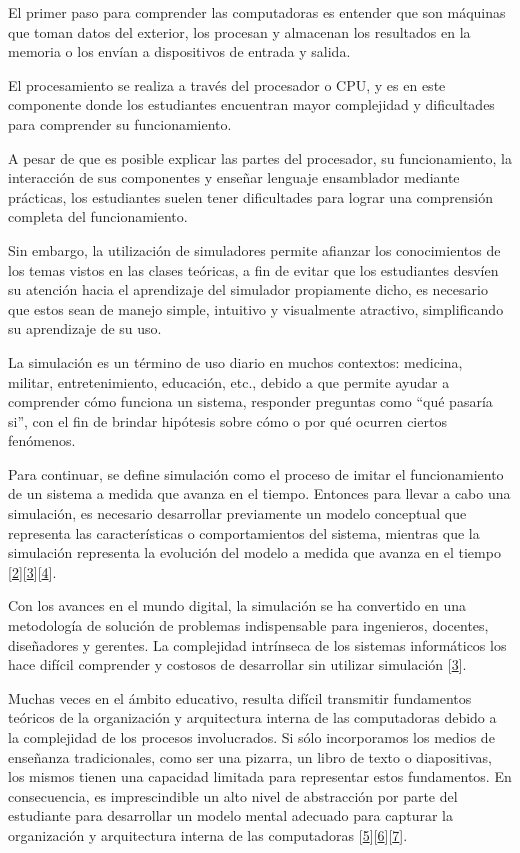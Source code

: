 \documentclass[12pt,twoside]{templates/unerthesis}
\begin{document}
El primer paso para comprender las computadoras es entender que son máquinas que toman datos del exterior, los procesan y almacenan los resultados en la memoria o los envían a dispositivos de entrada y salida.

El procesamiento se realiza a través del procesador o CPU, y es en este componente donde los estudiantes encuentran mayor complejidad y dificultades para comprender su funcionamiento.

A pesar de que es posible explicar las partes del procesador, su funcionamiento, la interacción de sus componentes y enseñar lenguaje ensamblador mediante prácticas, los estudiantes suelen tener dificultades para lograr una comprensión completa del funcionamiento.

Sin embargo, la utilización de simuladores permite afianzar los conocimientos de los temas vistos en las clases teóricas, a fin de evitar que los estudiantes desvíen su atención hacia el aprendizaje del simulador propiamente dicho, es necesario que estos sean de manejo simple, intuitivo y visualmente atractivo, simplificando su aprendizaje de su uso.

La simulación es un término de uso diario en muchos contextos: medicina, militar, entretenimiento, educación, etc., debido a que permite ayudar a comprender cómo funciona un sistema, responder preguntas como ``qué pasaría si'', con el fin de brindar hipótesis sobre cómo o por qué ocurren ciertos fenómenos.

Para continuar, se define simulación como el proceso de imitar el funcionamiento de un sistema a medida que avanza en el tiempo. Entonces para llevar a cabo una simulación, es necesario desarrollar previamente un modelo conceptual que representa las características o comportamientos del sistema, mientras que la simulación representa la evolución del modelo a medida que avanza en el tiempo {[}\protect\hyperlink{ref-banks_discrete-event_2010}{2}{]}{[}\protect\hyperlink{ref-law_simulation_2015}{3}{]}{[}\protect\hyperlink{ref-robinson_simulation_2014}{4}{]}.

Con los avances en el mundo digital, la simulación se ha convertido en una metodología de solución de problemas indispensable para ingenieros, docentes, diseñadores y gerentes. La complejidad intrínseca de los sistemas informáticos los hace difícil comprender y costosos de desarrollar sin utilizar simulación {[}\protect\hyperlink{ref-law_simulation_2015}{3}{]}.

Muchas veces en el ámbito educativo, resulta difícil transmitir fundamentos teóricos de la organización y arquitectura interna de las computadoras debido a la complejidad de los procesos involucrados. Si sólo incorporamos los medios de enseñanza tradicionales, como ser una pizarra, un libro de texto o diapositivas, los mismos tienen una capacidad limitada para representar estos fundamentos. En consecuencia, es imprescindible un alto nivel de abstracción por parte del estudiante para desarrollar un modelo mental adecuado para capturar la organización y arquitectura interna de las computadoras {[}\protect\hyperlink{ref-lion_simuladores_2005}{5}{]}{[}\protect\hyperlink{ref-contreras_uso_2010}{6}{]}{[}\protect\hyperlink{ref-garcia-garcia_pbbcache_2020}{7}{]}.
\end{document}
